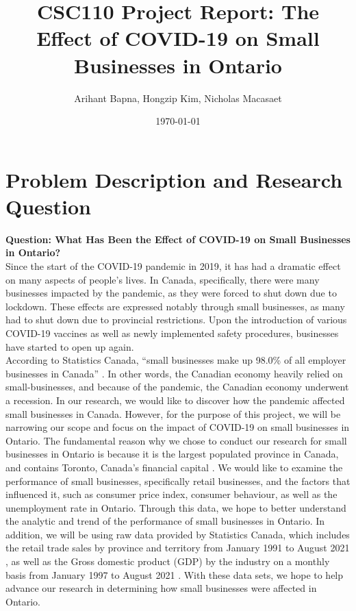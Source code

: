 \documentclass[fontsize=11pt]{article}
\title{CSC110 Project Report: The Effect of COVID-19 on Small Businesses in Ontario}
\author{Arihant Bapna, Hongzip Kim, Nicholas Macasaet}
\date{\today}
\begin{document}
    \maketitle

    \section*{Problem Description and Research Question}

    \textbf{Question: What Has Been the Effect of COVID-19 on Small Businesses in Ontario?} \\
    Since the start of the COVID-19 pandemic in 2019, it has had a dramatic effect on many aspects of people’s lives. In Canada, specifically, there were many businesses impacted by the pandemic, as they were forced to shut down due to lockdown. These effects are expressed notably through small businesses, as many had to shut down due to provincial restrictions. Upon the introduction of various COVID-19 vaccines as well as newly implemented safety procedures, businesses have started to open up again. \\
    According to Statistics Canada, “small businesses make up 98.0\% of all employer businesses in Canada” \autocite{numFive}. In other words, the Canadian economy heavily relied on small-businesses, and because of the pandemic, the Canadian economy underwent a recession. In our research, we would like to discover how the pandemic affected small businesses in Canada. However, for the purpose of this project, we will be narrowing our scope and focus on the impact of COVID-19 on small businesses in Ontario. The fundamental reason why we chose to conduct our research for small businesses in Ontario is because it is the largest populated province in Canada, and contains Toronto, Canada’s financial capital \autocite{numSix}. We would like to examine the performance of small businesses, specifically retail businesses, and the factors that influenced it, such as consumer price index, consumer behaviour, as well as the unemployment rate in Ontario. Through this data, we hope to better understand the analytic and trend of the performance of small businesses in Ontario. In addition, we will be using raw data provided by Statistics Canada, which includes the retail trade sales by province and territory from January 1991 to August 2021 \autocite{statcanRetail}, as well as the Gross domestic product (GDP) by the industry on a monthly basis from January 1997 to August 2021 \autocite{statcanGdp}. With these data sets, we hope to help advance our research in determining how small businesses were affected in Ontario.
\end{document}
